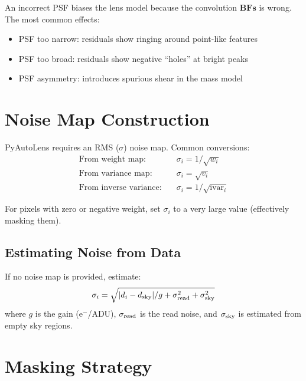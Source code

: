 \documentclass[11pt, letterpaper]{article}
\begin{document}
An incorrect PSF biases the lens model because the convolution
$\mathbf{B}\mathbf{F}\mathbf{s}$ is wrong. The most common effects:
\begin{itemize}[nosep]
  \item PSF too narrow: residuals show ringing around point-like features
  \item PSF too broad: residuals show negative ``holes'' at bright peaks
  \item PSF asymmetry: introduces spurious shear in the mass model
\end{itemize}

\section{Noise Map Construction}

PyAutoLens requires an RMS ($\sigma$) noise map. Common conversions:
\begin{align}
\text{From weight map}: \quad & \sigma_i = 1/\sqrt{w_i} \\
\text{From variance map}: \quad & \sigma_i = \sqrt{v_i} \\
\text{From inverse variance}: \quad & \sigma_i = 1/\sqrt{\text{ivar}_i}
\end{align}

For pixels with zero or negative weight, set $\sigma_i$ to a very large
value (effectively masking them).

\subsection{Estimating Noise from Data}

If no noise map is provided, estimate:
\begin{equation}
\sigma_i = \sqrt{|d_i - d_{\rm sky}| / g + \sigma_{\rm read}^2 + \sigma_{\rm sky}^2}
\end{equation}
where $g$ is the gain (e$^-$/ADU), $\sigma_{\rm read}$ is the read noise,
and $\sigma_{\rm sky}$ is estimated from empty sky regions.

\section{Masking Strategy}
\end{document}
